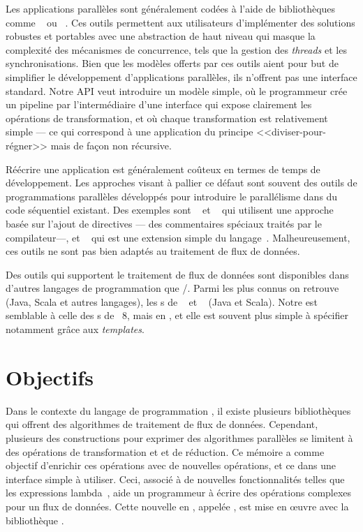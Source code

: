 \begin{introduction}
Les applications parall\`eles sont g\'en\'eralement cod\'ees \`a l'aide de biblioth\`eques comme ~\citep{AldinucciEtAl14} ou ~\citep{Reinders07}. Ces outils permettent aux utilisateurs d'implémenter des solutions robustes et portables avec une abstraction de haut niveau qui masque la complexit\'e des m\'ecanismes de concurrence, tels que la gestion des \emph{threads} et les synchronisations. Bien que les mod\`eles offerts par ces outils aient pour but de simplifier le d\'eveloppement d'applications parall\`eles, ils n'offrent pas une interface standard. Notre API veut introduire un mod\`ele simple, o\`u le programmeur cr\'ee un pipeline par l'interm\'ediaire d'une interface qui expose clairement les op\'erations de transformation, et o\`u chaque transformation est relativement simple --- ce qui correspond \`a une application du
principe <<diviser-pour-r\'egner>> mais de fa\c{c}on non r\'ecursive.

R\'e\'ecrire une application est g\'en\'eralement co\^uteux en termes de temps de d\'eveloppement. Les approches visant \`a pallier ce d\'efaut sont souvent des outils de programmations parall\`eles d\'evelopp\'es pour introduire le parall\'elisme dans du code s\'equentiel existant. Des exemples sont ~\citep{ChandraEtAl01} et ~\citep{farber2016parallel} qui utilisent une approche bas\'ee sur l'ajout de directives --- des commentaires sp\'eciaux trait\'es par le compilateur---, et ~\citep{leiserson1998programming} qui est une extension simple du langage~. Malheureusement, ces outils ne sont pas bien adapt\'es au traitement de flux de donn\'ees.

Des outils qui supportent le traitement de flux de donn\'ees sont disponibles dans d'autres langages de programmation que /. Parmi les plus connus on retrouve ~\citep{frampton2015mastering} (Java, Scala et autres langages), les s de ~\citep{warburton2014java} et ~\citep{flinkReferenceEnLigne} (Java et Scala). Notre  est semblable \`a celle des s de ~8, mais en , et elle est souvent plus simple \`a sp\'ecifier notamment gr\^ace aux \emph{templates}.



\section*{Objectifs}


Dans le contexte du langage de programmation , il existe plusieurs biblioth\`eques qui offrent des algorithmes de traitement de flux de donn\'ees. Cependant, plusieurs des constructions pour exprimer des algorithmes parall\`eles se limitent \`a des op\'erations de transformation et et de r\'eduction. Ce m\'emoire a comme objectif d'enrichir ces op\'erations avec de nouvelles op\'erations, et ce dans une interface simple \`a utiliser. Ceci, associ\'e \`a de nouvelles fonctionnalit\'es telles que les expressions lambda~\citep{josuttis2012c++}, aide un programmeur \`a \'ecrire des op\'erations complexes pour un flux de donn\'ees. Cette nouvelle  en , appel\'ee ,  est mise en \oe{}uvre avec la biblioth\`eque .



\end{introduction}
